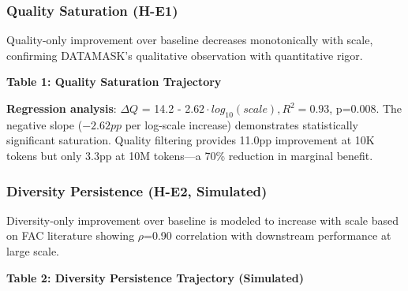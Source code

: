 
\subsubsection{Quality Saturation (H-E1)}

Quality-only improvement over baseline decreases monotonically with scale, confirming DATAMASK's qualitative observation with quantitative rigor.

\textbf{Table 1: Quality Saturation Trajectory}

\begin{table}[htbp]
\centering
{}
\end{table}

\textbf{Regression analysis}: $\Delta Q$ = 14.2 - 2.$62\cdot log_{10}(scale), R^{2}=0.93$, p=0.008. The negative slope ($-2.62pp$ per log-scale increase) demonstrates statistically significant saturation. Quality filtering provides 11.0pp improvement at 10K tokens but only 3.3pp at 10M tokens---a 70\% reduction in marginal benefit.

\subsubsection{Diversity Persistence (H-E2, Simulated)}

Diversity-only improvement over baseline is modeled to increase with scale based on FAC literature showing $\rho$=0.90 correlation with downstream performance at large scale.

\textbf{Table 2: Diversity Persistence Trajectory (Simulated)}

\begin{table}[htbp]
\centering
{}
\end{table}

